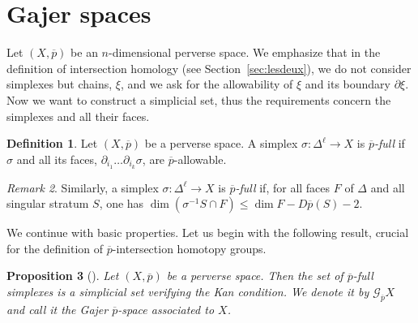 \documentclass[a4paper,10pt,english,reqno]{amsart}
\theoremstyle{plain}
\newtheorem{proposition}{Proposition}[section]
\theoremstyle{definition}
\newtheorem{definition}[proposition]{Definition}
\theoremstyle{remark}
\newtheorem{remark}[proposition]{Remark}
\numberwithin{equation}{section}
\newcommand{\secref}[1]{Section~\ref{#1}}
\def\ov{\overline}
\def\crG{{\mathscr G}}
\renewcommand\1{\hbox{\ding{192}}}
\renewcommand\2{\hbox{\ding{193}}}
\newcommand\3{\hbox{\ding{194}}}
\newcommand\4{\hbox{\ding{195}}}
\begin{document}
\section{Gajer spaces}\label{sec:gajerspace}


 Let $(X,\ov{p})$ be an $n$-dimensional perverse space.
% 
We emphasize that in the definition of intersection homology (see \secref{sec:lesdeux}), 
we do not consider simplexes but chains, $\xi$, and 
we ask for the allowability of $\xi$ and its boundary $\partial \xi$. 
Now we want to construct a simplicial set,
thus the requirements concern the simplexes and all their faces.  

\begin{definition}\label{def:gajersimplicialset}
%
 Let $(X,\ov{p})$ be a  perverse space.
 A simplex $\sigma\colon \Delta^{\ell}\to X$ is  \emph{$\ov{p}$-full}  if
$\sigma$ and all its faces, $\partial_{i_{1}} \dots \partial_{i_{k}}\sigma$,
 are $\ov{p}$-allowable.
 \end{definition}

\begin{remark}
Similarly,  a simplex $\sigma\colon \Delta^{\ell}\to X$ is  \emph{$\ov{p}$-full} if,
for all faces $F$ of $\Delta$ and all singular stratum $S$, one has
$\dim(\sigma^{-1}S\cap F)\leq \dim F-D\ov{p}(S)-2$.
%
\end{remark}



We continue with basic properties. 
Let us begin with the following result, crucial for the definition of $\ov{p}$-intersection homotopy groups.

\begin{proposition}[{\cite[Page 946]{MR1404919}}]\label{prop:gajerkan}
Let $(X,\ov{p})$ be a perverse space. Then the set of $\ov{p}$-full simplexes is a simplicial set
verifying the Kan condition. We  denote it by $\crG_{\ov{p}}X$ and call it
 the \emph{Gajer $\ov{p}$-space} associated to $X$.
\end{proposition}
\end{document}
